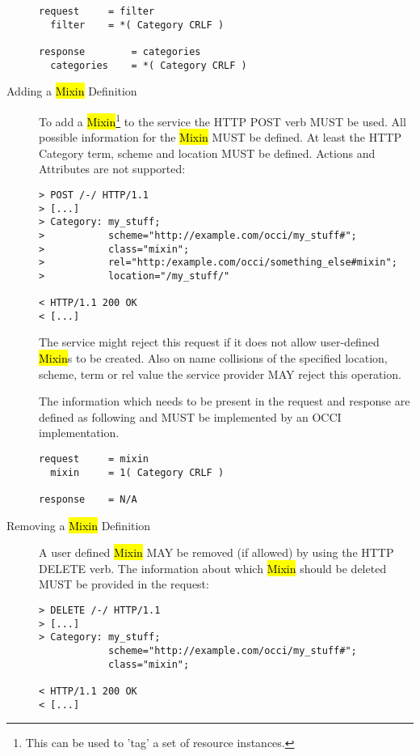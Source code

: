 \documentclass[10pt,a4paper]{article}
\begin{document}
\begin{description}
\begin{verbatim}
request     = filter
  filter    = *( Category CRLF )

response        = categories
  categories    = *( Category CRLF )
\end{verbatim}

  \item[Adding a \hl{Mixin} Definition] To add a
    \hl{Mixin}\footnote{This can be used to 'tag' a set of resource
      instances.} to the service the HTTP POST verb MUST be used. All
    possible information for the \hl{Mixin} MUST be defined. At least
    the HTTP Category term, scheme and location MUST be
    defined. Actions and Attributes are not supported:

\begin{verbatim}
> POST /-/ HTTP/1.1
> [...]
> Category: my_stuff;
>           scheme="http://example.com/occi/my_stuff#";
>           class="mixin";
>           rel="http:/example.com/occi/something_else#mixin";
>           location="/my_stuff/"

< HTTP/1.1 200 OK
< [...]
\end{verbatim}

    The service might reject this request if it does not allow
    user-defined \hl{Mixin}s to be created. Also on name collisions of
    the specified location, scheme, term or rel value the service
    provider MAY reject this operation.

    The information which needs to be present in the request and
    response are defined as following and MUST be implemented by an
    OCCI implementation.

\begin{verbatim}
request     = mixin
  mixin     = 1( Category CRLF )

response    = N/A
\end{verbatim}

  \item[Removing a \hl{Mixin} Definition] A user defined \hl{Mixin}
    MAY be removed (if allowed) by using the HTTP DELETE verb. The
    information about which \hl{Mixin} should be deleted MUST be
    provided in the request:
    
\begin{verbatim}
> DELETE /-/ HTTP/1.1
> [...]
> Category: my_stuff; 
            scheme="http://example.com/occi/my_stuff#"; 
            class="mixin";

< HTTP/1.1 200 OK
< [...]
\end{verbatim}


\end{description}
\end{document}
